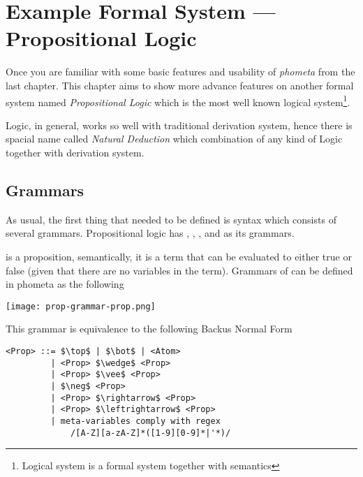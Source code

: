 \documentclass[master.tex]{subfiles}
\begin{document}
\chapter{Example Formal System --- Propositional Logic}
\label{chap:example_propositional_logic}

Once you are familiar with some basic features and usability of \emph{phometa}
from the last chapter. This chapter aims to show more advance features on
another formal system named \emph{Propositional Logic} which is the most well
known logical system\footnote{Logical system is a formal system together with
  semantics\supercite{formal-system-wiki}}.

Logic, in general, works so well with traditional derivation system, hence there
is spacial name called \emph{Natural Deduction} which combination of any kind of
Logic together with derivation system.

\section{Grammars}

As usual, the first thing that needed to be defined is syntax which consists of
several grammars. Propositional logic has , ,
, and  as its grammars.

 is a proposition, semantically, it is a term that can be evaluated
to either true or false (given that there are no variables in the term).
Grammars of  can be defined in phometa as the following

\centerline{\texttt{[image: prop-grammar-prop.png]}}

This grammar is equivalence to the following Backus Normal Form
\begin{lstlisting}[style=bnf]
<Prop> ::= $\top$ | $\bot$ | <Atom>
         | <Prop> $\wedge$ <Prop>
         | <Prop> $\vee$ <Prop>
         | $\neg$ <Prop>
         | <Prop> $\rightarrow$ <Prop>
         | <Prop> $\leftrightarrow$ <Prop>
         | meta-variables comply with regex
             /[A-Z][a-zA-Z]*([1-9][0-9]*|'*)/
\end{lstlisting}

\newcommand{\propTop}[0]{\bat{\pifmt{$\top$}}}
\newcommand{\propBot}[0]{\bat{\pifmt{$\bot$}}}
\newcommand{\propAnd}[0]{\pifmt{$\wedge$}}
\newcommand{\propOr}[0]{\pifmt{$\vee$}}
\newcommand{\propNot}[0]{\pifmt{$\neg$}}
\newcommand{\propImp}[0]{\pifmt{$\rightarrow$}}
\newcommand{\propIff}[0]{\pifmt{$\leftrightarrow$}}
\end{document}
